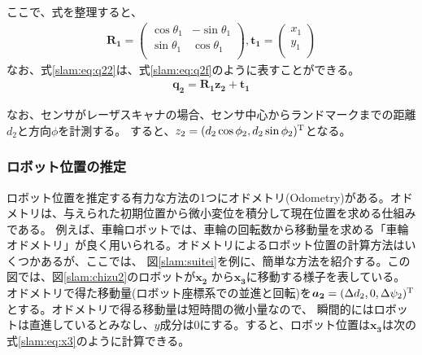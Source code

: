 ここで、式を整理すると、
\begin{align}
  \bm{R_1} = 
  \begin{pmatrix}
    \cos\theta_1&-\sin\theta_1\\
    \sin\theta_1&\cos\theta_1\\
  \end{pmatrix},
  \bm{t_1} =
  \begin{pmatrix}
    x_1\\
    y_1\\
  \end{pmatrix}\label{slam:eq:q22}
\end{align}
なお、式\eqref{slam:eq:q22}は、式\eqref{slam:eq:q2f}のように表すことができる。
\begin{align}
  \bm{q_2} = \bm{R_1}\bm{z_2}+\bm{t_1} \label{slam:eq:q2f}
\end{align}

なお、センサがレーザスキャナの場合、センサ中心からランドマークまでの距離$d_2$と方向$\phi$を計測する。
すると、$z_2 = (d_2\cos\phi_2,d_2\sin\phi_2)^{\rm{T}}$となる。

\subsubsection{ロボット位置の推定}
ロボット位置を推定する有力な方法の1つにオドメトリ(Odometry)がある。オドメトリは、与えられた初期位置から微小変位を積分して現在位置を求める仕組みである。
例えば、車輪ロボットでは、車輪の回転数から移動量を求める「車輪オドメトリ」が良く用いられる。オドメトリによるロボット位置の計算方法はいくつかあるが、ここでは、
図\ref{slam:suitei}を例に、簡単な方法を紹介する。この図では、図\ref{slam:chizu2}のロボットが$\bm{x_2}$ から$\bm{x_3}$に移動する様子を表している。
オドメトリで得た移動量(ロボット座標系での並進と回転)を$\bm{a_2} = (\Delta d_2,0,\Delta\psi_2)^{\rm{T}}$とする。オドメトリで得る移動量は短時間の微小量なので、
瞬間的にはロボットは直進しているとみなし、$y$成分は0にする。すると、ロボット位置は$\bm{x_3}$は次の式\eqref{slam:eq:x3}のように計算できる。

